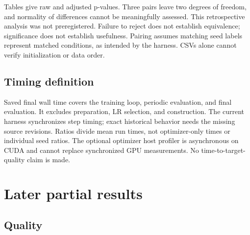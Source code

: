 \documentclass[11pt,a4paper]{article}
\begin{document}
Tables give raw and adjusted p-values. Three pairs leave two degrees of freedom, and normality of differences cannot be meaningfully assessed. This retrospective analysis was not preregistered. Failure to reject does not establish equivalence; significance does not establish usefulness. Pairing assumes matching seed labels represent matched conditions, as intended by the harness. CSVs alone cannot verify initialization or data order.

\subsection{Timing definition}

Saved final wall time covers the training loop, periodic evaluation, and final evaluation. It excludes preparation, LR selection, and  construction. The current harness synchronizes step timing; exact historical behavior needs the missing source revisions. Ratios divide mean run times, not optimizer-only times or individual seed ratios. The optional optimizer host profiler is asynchronous on CUDA and cannot replace synchronized GPU measurements. No time-to-target-quality claim is made.

\section{Later partial results}

\subsection{Quality}
\end{document}
